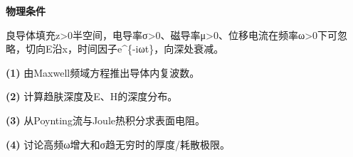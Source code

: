\textbf{物理条件}\par 良导体填充z>0半空间，电导率σ>0、磁导率μ>0、位移电流在频率ω>0下可忽略，切向E沿x，时间因子e\textasciicircum{}\{-iωt\}，向深处衰减。
\par\noindent\textbf{(1)} 由Maxwell频域方程推出导体内复波数。
\par\noindent\textbf{(2)} 计算趋肤深度及E、H的深度分布。
\par\noindent\textbf{(3)} 从Poynting流与Joule热积分求表面电阻。
\par\noindent\textbf{(4)} 讨论高频ω增大和σ趋无穷时的厚度/耗散极限。
